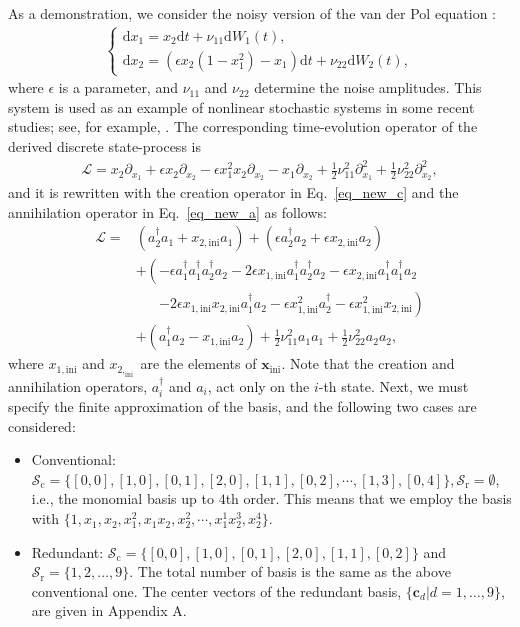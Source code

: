 \documentclass[sn-mathphys,Numbered]{sn-jnl}%
\theoremstyle{thmstyleone}%
\theoremstyle{thmstyletwo}%
\theoremstyle{thmstylethree}%
\begin{document}
As a demonstration, we consider the noisy version of the van der Pol equation \cite{VanderPol1926}:
\begin{align}
\begin{cases}
\mathrm{d}x_1 = x_2\mathrm{d}t + \nu_{11}\mathrm{d}W_1(t), \\
\mathrm{d}x_2 = (\epsilon x_2(1-x_1^2)-x_1)\mathrm{d}t + \nu_{22}\mathrm{d}W_2(t),
\end{cases}
\label{eq_noisy_van_der_pol}
\end{align}
where $\epsilon$ is a parameter, and $\nu_{11}$ and $\nu_{22}$ determine the noise amplitudes. This system is used as an example of nonlinear stochastic systems in some recent studies; see, for example, \cite{Crnjaric2020}. The corresponding time-evolution operator of the derived discrete state-process is
\begin{align}
\mathcal{L} = x_2\partial_{x_1}+ \epsilon x_2 \partial_{x_2} - \epsilon x_1^2 x_2 \partial_{x_2} - x_1 \partial_{x_2} 
+ \frac{1}{2}\nu_{11}^2\partial_{x_1}^2 + \frac{1}{2}\nu_{22}^2\partial_{x_2}^2,
\end{align}
and it is rewritten with the creation operator in Eq.~\eqref{eq_new_c} and the annihilation operator in Eq.~\eqref{eq_new_a} as follows:
\begin{align}
\mathcal{L} = & \left(a_2^\dagger a_1 + x_{2,\mathrm{ini}} a_1 \right)
+ \left( \epsilon a_2^\dagger a_2 + \epsilon x_{2,\mathrm{ini}} a_2\right) \nonumber \\
& + \left(- \epsilon a_1^\dagger a_1^\dagger a_2^\dagger a_2
- 2 \epsilon x_{1,\mathrm{ini}} a_1^\dagger a_2^\dagger a_2 - \epsilon x_{2,\mathrm{ini}} a_1^\dagger a_1^\dagger a_2 \right. \nonumber \\
&\quad \,\,\,\, \left.-2\epsilon x_{1,\mathrm{ini}} x_{2,\mathrm{ini}} a_1^\dagger a_2 - \epsilon x_{1,\mathrm{ini}}^2 a_2^\dagger - \epsilon x_{1,\mathrm{ini}}^2 x_{2,\mathrm{ini}} \right) \nonumber \\
&+ \left( a_1^\dagger a_2 - x_{1,\mathrm{ini}} a_2 \right) 
+ \frac{1}{2}\nu_{11}^2 a_1 a_1 + \frac{1}{2}\nu_{22}^2 a_2 a_2,
\end{align}
where $x_{1,\mathrm{ini}}$ and $x_{2,_\mathrm{ini}}$ are the elements of $\bm{x}_\mathrm{ini}$. Note that the creation and annihilation operators, $a_i^\dagger$ and $a_i$, act only on the $i$-th state. Next, we must specify the finite approximation of the basis, and the following two cases are considered:
\begin{itemize}
\item Conventional: 
$\mathcal{S}_\mathrm{c} = \{[0,0], [1,0], [0,1], [2,0], [1,1], [0,2], \cdots, [1,3], [0,4]\}, \mathcal{S}_\mathrm{r} = \emptyset$, i.e., the monomial basis up to $4$th order. This means that we employ the basis with $\{1, x_1, x_2, x_1^2, x_1 x_2, x_2^2, \cdots, x_1^1 x_2^3, x_2^4 \}$.
\item Redundant: $\mathcal{S}_\mathrm{c} = \{[0,0], [1,0], [0,1], [2,0], [1,1], [0,2]\}$ and $\mathcal{S}_\mathrm{r} = \{1,2,\dots, 9\}$. The total number of basis is the same as the above conventional one. The center vectors of the redundant basis, $\{\bm{c}_{d} | d = 1, \dots, 9\}$, are given in Appendix A.
\end{itemize}
\end{document}

